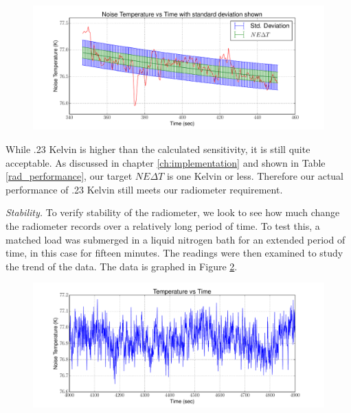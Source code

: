 \begin{figure}[h!tb] \centering
\includegraphics[width=\textwidth]{Experiments/Exp1/std_dev_errbar.pdf}
\label{sensitivity_exp_real}
\end{figure}

While .23 Kelvin is higher than the calculated sensitivity, it is still quite acceptable.  As discussed in chapter \ref{ch:implementation} and shown in Table \ref{rad_performance}, our target $NE\Delta T$ is one Kelvin or less.  Therefore our actual performance of .23 Kelvin still meets our radiometer requirement.

\emph{Stability.}  To verify stability of the radiometer, we look to see how much change the radiometer records over a relatively long period of time.  To test this, a matched load was submerged in a liquid nitrogen bath for an extended period of time, in this case for fifteen minutes.  The readings were then examined to study the trend of the data.  The data is graphed in Figure \ref{Stability}.

\begin{figure}[h!tb] \centering
\includegraphics[width=\textwidth]{Experiments/Exp2/sdr_calibrated_zoom.pdf}
\label{Stability}
\end{figure}

